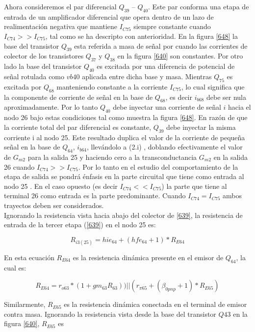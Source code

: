 \documentclass[12pt,a4paper,final,headinclude,footinclude,BCOR5mm]{scrartcl}
\begin{document}
Ahora consideremos el par diferencial $Q_{39}$ – $Q_{40}$. Este par conforma una etapa de entrada de un amplificador diferencial que opera dentro de un lazo de realimentación negativa que mantiene $I_{C75}$ siempre constante cuando $I_{C74} >> I_{C75}$, tal como se ha descripto con anterioridad. En la figura \ref{648} la base del transistor $Q_{39}$ esta referida a masa de señal  por cuando las corrientes de colector de los transistores $Q_{37}$ y $Q_{38}$ en la figura \ref{640} son constantes. Por otro lado la base del transistor $Q_{40}$ es excitada por una diferencia de potencial de señal rotulada como $vb40$ aplicada entre dicha base y masa. Mientras $Q_{75}$ es excitada por $Q_{68}$ manteniendo constante a la corriente $I_{C75}$, lo cual significa que la componente de corriente de señal  en la base de $Q_{68}$, es decir $i_{b68}$ debe ser nula aproximadamente. Por lo tanto $Q_{40}$ debe inyectar una corriente de señal $i$ hacia el nodo 26 bajo estas condiciones tal como muestra la figura \ref{648}. En razón de que la corriente total del par diferencial es constante, $Q_{39}$ debe inyectar la misma corriente i al nodo 25. Este resultado duplica el valor de la corriente de pequeña señal en la base de $Q_{64}$, $i_{b64}$, llevándolo a (2.i) ,  doblando efectivamente el valor de $G_{m2}$ para la salida 25 y haciendo cero a la transconductancia $G_{m2}$ en la salida 26 cuando $I_{C74} >> I_{C75}$. Por lo tanto en el estudio del comportamiento de la etapa de salida se pondrá énfasis en  la parte circuital que tiene como entrada al nodo 25 . En el caso opuesto (es decir $I_{C74} << I_{C75}$) la parte que tiene al terminal 26 como entrada es la parte predominante. Cuando $I_{C74} = I_{C75}$ ambos trayectos deben ser considerados.\\

Ignorando la resistencia vista hacia abajo del colector de \ref{639},  la resistencia de entrada de la tercer etapa (\ref{639}) en el nodo 25 es:

$$R_{i3(25)} = hie_{64} + (hfe_{64} + 1)*R_{E64}$$

En esta ecuación $R_{E64}$ es la resistencia dinámica presente en el emisor de $Q_{64}$, la cual es:

$$R_{E64} = r_{o63}*(1+gm_{63}R_{63}))||(r_{\pi 65}+(\beta_{0pnp}+1)*R_{E65})$$

Similarmente, $R_{E65}$ es la resistencia dinámica conectada en el terminal de emisor contra masa. Ignorando la resistencia vista desde la base del transistor $Q{43}$ en la figura \ref{640}, $R_{E65}$ es
\end{document}
